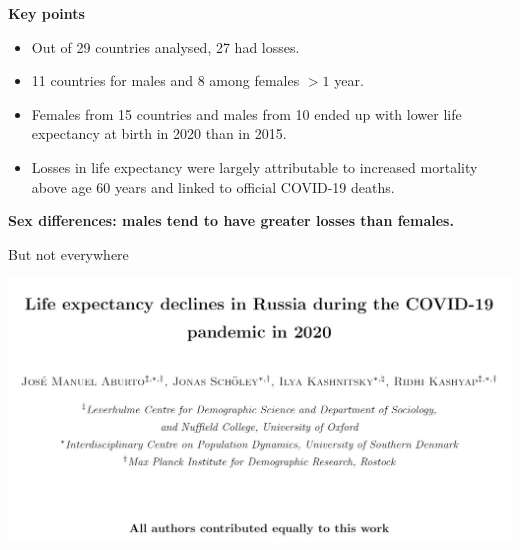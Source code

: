 \documentclass[xcolor={dvipsnames}]{beamer}
\begin{document}
\begin{frame}
	\begin{center}
 		\LARGE{\textbf{Key points}}
 		\Large{
 		\begin{itemize}
 		\item Out of 29 countries analysed, 27 had losses. \pause
 		\item 11 countries for males and 8 among females  $>1$ year. \pause
 		\item Females from 15 countries and males from 10 ended up with lower life expectancy at birth in 2020 than in 2015.\pause
 		\item Losses in life expectancy were largely attributable to increased mortality above age 60 years and linked to official COVID-19 deaths.

 		\end{itemize}
 		}
	\end{center}
\end{frame}



\begin{frame}
	\begin{center}
	
			\LARGE{\textbf{Sex differences: males tend to have greater losses than 				females.}\linebreak \\ \pause
			
			But not everywhere}
		
	\end{center}
\end{frame}


\begin{frame}
	\begin{center}
	
		\includegraphics[scale=.6]{Figures/russia}		
		
	\end{center}
\end{frame}
\end{document}
